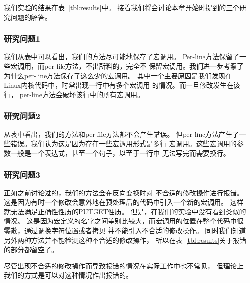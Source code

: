 
我们实验的结果在表~\ref{tbl:results}中。
接着我们将会讨论本章开始时提到的三个研究问题的解答。 

\subsubsection{研究问题1} 我们从表中可以看出，我们的方法尽可能地保存了宏调用。 
Per-line方法保留了一些宏调用，而per-file方法，不出所料的，完全不
保留宏调用。我们进一步考察了为什么per-line方法保存了这么少的宏调用。
其中一个主要原因是我们发现在Linux内核代码中，时常出现一行中有多个宏调用
的情况。而一旦修改发生在该行，
per-line方法会破坏该行中的所有宏调用。
\subsubsection{研究问题2} 从表中看出，我们的方法和per-file方法都不会产生错误。
但per-line方法产生了一些错误。我们认为这是因为存在一些宏调用形式是多行
宏调用。这些宏调用的参数一般是一个表达式，甚至一个句子，以至于一行中
无法写完而需要换行。
\subsubsection{研究问题3} 正如之前讨论过的，我们的方法会在反向变换时对
不合适的修改操作进行报错。这是因为有时一个修改会意外地在预处理后的代码中引入一个新的宏调用。
这样就无法满足正确性性质的PUTGET性质。
但是，在我们的实验中没有看到类似的情况。
这是因为宏定义的名字之间差别比较大，而宏调用的位置在整个代码中很零散，通过调换字符位置或者拷贝
并不能引入不合适的修改操作。
同时我们知道另外两种方法并不能检测这种不合适的修改操作，
所以在表~\ref{tbl:results}关于报错的部分都留空了。

尽管出现不合适的修改操作而导致报错的情况在实际工作中也不常见，
但理论上我们的方式是可以对这种情况作出报错的。

